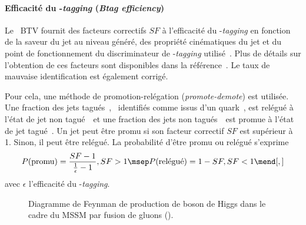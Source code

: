 \paragraph{Efficacité du \quarkb-\emph{tagging} (\emph{Btag efficiency})}
Le \POG\ BTV fournit des facteurs correctifs $SF$ à l'efficacité du \quarkb-\emph{tagging} en fonction de la saveur du jet au niveau généré, des propriété cinématiques du jet et du point de fonctionnement du discriminateur de \quarkb-\emph{tagging} utilisé~\cite{BTV}.
Plus de détails sur l'obtention de ces facteurs sont disponibles dans la référence~\cite{Sirunyan_heavy_flavor_jets_2018}.
Le taux de mauvaise identification est également corrigé.
\par
Pour cela, une méthode de promotion-relégation (\emph{promote-demote}) est utilisée.
Une fraction des jets tagués~\quarkb, \ie\ identifiés comme issus d'un quark~\quarkb, est relégué à l'état de jet non tagué~\quarkb\ et
une fraction des jets non tagués~\quarkb\ est promue à l'état de jet tagué~\quarkb.
Un jet peut être promu si son facteur correctif $SF$ est supérieur à 1.
Sinon, il peut être relégué.
La probabilité d'être promu ou relégué s'exprime
\begin{equation}
P(\text{promu}) = \frac{SF-1}{\frac{1}{\epsilon}-1}, SF > 1
\msep
P(\text{relégué}) = 1 - SF, SF < 1
\mend[,]
\end{equation}
avec $\epsilon$ l'efficacité du \quarkb-\emph{tagging}.
\begin{wrapfigure}{R}{5cm}
\vspace{\baselineskip}
\centering
\vspace{\baselineskip}
\caption[Production de boson de Higgs du MSSM par fusion de gluons.]{Diagramme de Feynman de production de boson de Higgs dans le cadre du MSSM par fusion de gluons (\gluon\gluon\Higgs).}
\label{fig-chapter-HTT_analysis-section-corrections-fgraph-gg_loop_hHA}
\end{wrapfigure}
